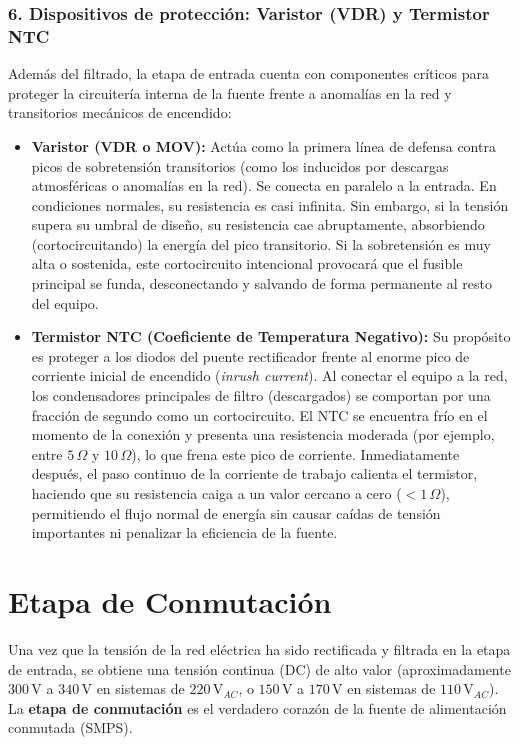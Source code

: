 \documentclass[12pt, a4paper]{article}
\begin{document}
\subsubsection*{6. Dispositivos de protección: Varistor (VDR) y Termistor NTC}
Además del filtrado, la etapa de entrada cuenta con componentes críticos para proteger la circuitería interna de la fuente frente a anomalías en la red y transitorios mecánicos de encendido:
\begin{itemize}
    \item \textbf{Varistor (VDR o MOV):} Actúa como la primera línea de defensa contra picos de sobretensión transitorios (como los inducidos por descargas atmosféricas o anomalías en la red). Se conecta en paralelo a la entrada. En condiciones normales, su resistencia es casi infinita. Sin embargo, si la tensión supera su umbral de diseño, su resistencia cae abruptamente, absorbiendo (cortocircuitando) la energía del pico transitorio. Si la sobretensión es muy alta o sostenida, este cortocircuito intencional provocará que el fusible principal se funda, desconectando y salvando de forma permanente al resto del equipo.
    \item \textbf{Termistor NTC (Coeficiente de Temperatura Negativo):} Su propósito es proteger a los diodos del puente rectificador frente al enorme pico de corriente inicial de encendido (\textit{inrush current}). Al conectar el equipo a la red, los condensadores principales de filtro (descargados) se comportan por una fracción de segundo como un cortocircuito. El NTC se encuentra frío en el momento de la conexión y presenta una resistencia moderada (por ejemplo, entre $5\,\Omega$ y $10\,\Omega$), lo que frena este pico de corriente. Inmediatamente después, el paso continuo de la corriente de trabajo calienta el termistor, haciendo que su resistencia caiga a un valor cercano a cero ($<1\,\Omega$), permitiendo el flujo normal de energía sin causar caídas de tensión importantes ni penalizar la eficiencia de la fuente.
\end{itemize}

\newpage
\section{Etapa de Conmutación}

Una vez que la tensión de la red eléctrica ha sido rectificada y filtrada en la etapa de entrada, se obtiene una tensión continua (DC) de alto valor (aproximadamente $300\,\text{V}$ a $340\,\text{V}$ en sistemas de $220\,\text{V}_{AC}$, o $150\,\text{V}$ a $170\,\text{V}$ en sistemas de $110\,\text{V}_{AC}$). La \textbf{etapa de conmutación} es el verdadero corazón de la fuente de alimentación conmutada (SMPS). 
\end{document}
